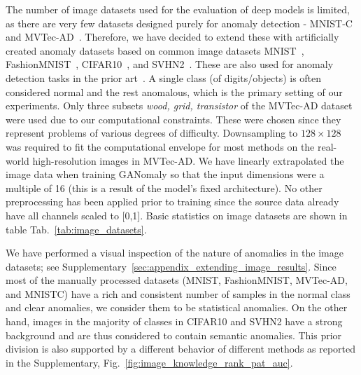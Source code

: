 The number of image datasets used for the evaluation of deep models is limited, as there are very few datasets designed purely for anomaly detection - MNIST-C~\cite{muMNISTCRobustnessBenchmark2019} and MVTec-AD~\cite{bergmannMVTecADComprehensive2019}. Therefore, we have decided to extend these with artificially created anomaly datasets based on common image datasets MNIST~\cite{lecun-mnisthandwrittendigit-2010}, FashionMNIST~\cite{xiao2017fashion}, CIFAR10~\cite{krizhevsky2009learning}, and SVHN2~\cite{netzer2011reading}. These are also used for anomaly detection tasks in the prior art~\cite{perera2019ocgan, pidhorskyi2018generative, ruff2018deep}. A single class (of digits/objects) is often considered normal and the rest anomalous, which is the primary setting of our experiments. Only three subsets \textit{wood, grid, transistor} of the MVTec-AD dataset were used due to our computational constraints. These were chosen since they represent problems of various degrees of difficulty. Downsampling to $128 \times 128$ was required to fit the computational envelope for most methods on the real-world high-resolution images in MVTec-AD.  We have linearly extrapolated the image data when training GANomaly so that the input dimensions were a multiple of 16 (this is a result of the model's fixed architecture). No other preprocessing has been applied prior to training since the source data already have all channels scaled to [0,1].  Basic statistics on image datasets are shown in table Tab.~\ref{tab:image_datasets}. 

We have performed a visual inspection of the nature of anomalies in the image datasets; see Supplementary~\ref{sec:appendix_extending_image_results}. Since most of the manually processed datasets (MNIST, FashionMNIST, MVTec-AD, and MNISTC) have a rich and consistent number of samples in the normal class and clear anomalies, we consider them to be statistical anomalies. On the other hand, images in the majority of classes in CIFAR10 and SVHN2 have a strong background and are thus considered to contain semantic anomalies. This prior division is also supported by a different behavior of different methods as reported in the Supplementary, Fig.~\ref{fig:image_knowledge_rank_pat_auc}. 

